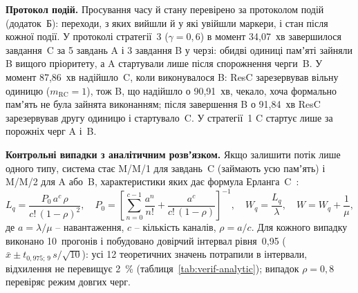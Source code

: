 \textbf{Протокол подій.} Просування часу й стану перевірено за протоколом подій (додаток~Б):
переходи, з яких вийшли й у які увійшли маркери, і стан після кожної події. У протоколі стратегії~3
($\gamma = 0{,}6$) в момент 34,07~хв завершилося завдання~C за 5 завдань A і 3 завдання B у черзі:
обидві одиниці памʼяті зайняли B вищого пріоритету, а A стартували лише після спорожнення черги~B.
У момент 87,86~хв надійшло~C, коли виконувалося B: ResC зарезервував вільну одиницю
($m_{\text{RC}} = 1$), тож B, що надійшло о 90,91~хв, чекало, хоча формально памʼять не була
зайнята виконанням; після завершення B о 91,84~хв ResC
зарезервував другу одиницю і стартувало~C. У стратегії~1 C стартує лише за порожніх черг A і~B.

\textbf{Контрольні випадки з аналітичним розвʼязком.} Якщо залишити потік лише одного типу,
система стає M/M/1 для завдань~C (займають усю памʼять) і M/M/2 для A або~B, характеристики
яких дає формула Ерланга~C~\cite{kleinrock}:
\begin{equation}\label{eq:erlang}
  L_q = \frac{P_0\,a^c\,\rho}{c!\,(1-\rho)^2}, \quad
  P_0 = \left[\sum_{n=0}^{c-1}\frac{a^n}{n!} + \frac{a^c}{c!\,(1-\rho)}\right]^{-1}, \quad
  W_q = \frac{L_q}{\lambda}, \quad W = W_q + \frac{1}{\mu},
\end{equation}
де $a = \lambda/\mu$ -- навантаження, $c$ -- кількість каналів, $\rho = a/c$. Для кожного випадку
виконано 10~прогонів і побудовано довірчий інтервал рівня~0,95 ($\bar x \pm
t_{0{,}975;\,9}\,s/\sqrt{10}$): усі 12 теоретичних значень потрапили в інтервали, відхилення
не перевищує 2~\% (таблиця~\ref{tab:verif-analytic}); випадок $\rho = 0{,}8$ перевіряє режим
довгих черг.

